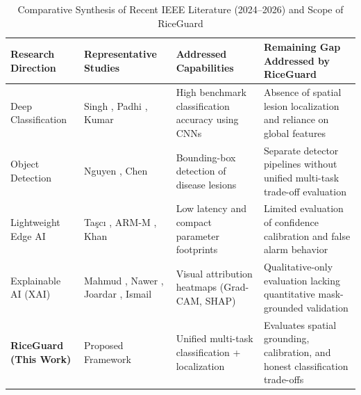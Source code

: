 \begin{table}[htbp]
\centering
\caption{Comparative Synthesis of Recent IEEE Literature (2024--2026) and Scope of RiceGuard}
\label{tab:lit_gap}
\begin{tabular}{p{3.2cm}p{3.2cm}p{4.8cm}p{5.0cm}}
\hline
\textbf{Research Direction} & \textbf{Representative Studies} & \textbf{Addressed Capabilities} & \textbf{Remaining Gap Addressed by RiceGuard} \\
\hline
Deep Classification & Singh \cite{ref2}, Padhi \cite{ref15}, Kumar \cite{ref19} & High benchmark classification accuracy using CNNs & Absence of spatial lesion localization and reliance on global features \\
Object Detection & Nguyen \cite{ref1}, Chen \cite{ref12} & Bounding-box detection of disease lesions & Separate detector pipelines without unified multi-task trade-off evaluation \\
Lightweight Edge AI & Ta{\c{s}}c{\i} \cite{ref3}, ARM-M \cite{ref14}, Khan \cite{ref9} & Low latency and compact parameter footprints & Limited evaluation of confidence calibration and false alarm behavior \\
Explainable AI (XAI) & Mahmud \cite{ref4}, Nawer \cite{ref5}, Joardar \cite{ref7}, Ismail \cite{ref6} & Visual attribution heatmaps (Grad-CAM, SHAP) & Qualitative-only evaluation lacking quantitative mask-grounded validation \\
\textbf{RiceGuard (This Work)} & Proposed Framework & Unified multi-task classification + localization & Evaluates spatial grounding, calibration, and honest classification trade-offs \\
\hline
\end{tabular}
\end{table}
